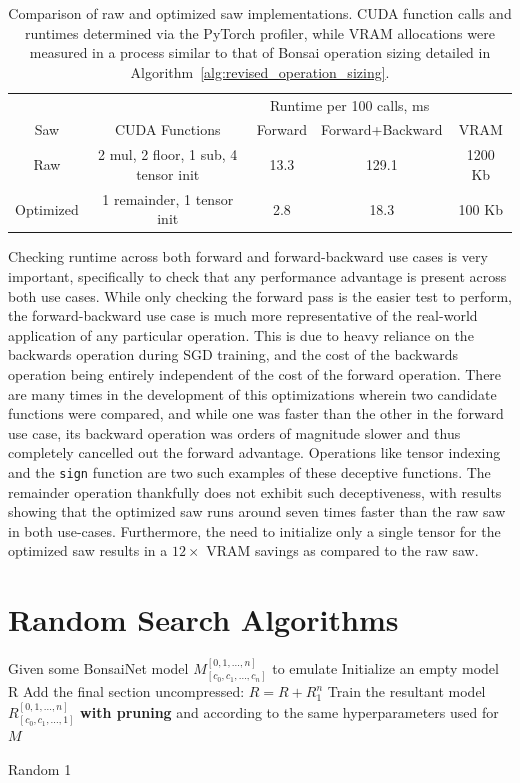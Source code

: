 \begin{table}[h]
\begin{center}
\begin{tabular}{c|c|c|c|c}
& & \multicolumn{2}{c|}{Runtime per 100 calls, ms} &  \\
Saw & CUDA Functions & Forward & Forward+Backward & VRAM\\
		  \hline
Raw		& 2 mul, 2 floor, 1 sub, 4 tensor init & 13.3 & 129.1 & 1200 Kb\\
Optimized     & 1 remainder, 1 tensor init & 2.8 & 18.3 & 100 Kb\\
\end{tabular}
\end{center}
\caption[Comparison of raw and optimized saw implementations]{Comparison of raw and optimized saw implementations. CUDA function calls and
runtimes determined via the PyTorch profiler, while VRAM allocations were measured in a process similar to that of Bonsai operation
sizing detailed in Algorithm~\ref{alg:revised_operation_sizing}.}
\label{tab:saw_implementations}
\end{table}

Checking runtime across both forward and forward-backward use cases is very important, specifically to check that
any performance advantage is present across both use cases. While only checking the forward pass is
the easier test to perform, the forward-backward use case is much more representative of the real-world application of any
particular operation. This is due to heavy reliance on the backwards operation during SGD training, and the cost
of the backwards operation being entirely independent of the cost of the forward operation. There are many times in the development
of this optimizations wherein two candidate functions were compared, and while one was faster than the other in the forward use case,
its backward operation was orders of magnitude slower and thus completely cancelled out the forward advantage.
Operations like tensor indexing and the \texttt{sign} function are two such examples of these deceptive functions.
The remainder operation thankfully does not exhibit such deceptiveness, with results showing that the optimized saw runs
around seven times faster than the raw saw in both use-cases. Furthermore, the need to initialize only a single tensor for
the optimized saw results in a $12\times$ VRAM savings as compared to the raw saw.

\section{Random Search Algorithms}
\begin{algorithm}[ht!]
\SetAlgoLined
Given some BonsaiNet model $M^{[0,1,\dots,n]}_{[c_0,c_1,\dots, c_n]}$ to emulate\;
Initialize an empty model R\;
\BlankLine
{}
Add the final section uncompressed: $R = R + R^n_{1}$\;
Train the resultant model $R^{[0,1,\dots,n]}_{[c_0,c_1,\dots,1]}$ \textbf{with pruning} and according to the same hyperparameters used for $M$\;
\caption{Random 1}
\label{alg:bonsai_r1}
\end{algorithm}

